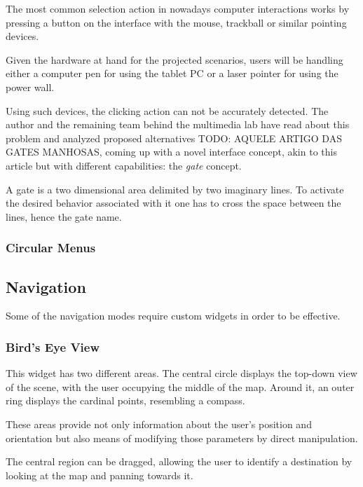 The most common selection action in nowadays computer interactions works by
pressing a button on the interface with the mouse, trackball or similar pointing devices.

Given the hardware at hand for the projected scenarios,
users will be handling either a computer pen for using the tablet PC or a laser pointer for using the power wall.

Using such devices, the clicking action can not be accurately detected.
The author and the remaining team behind the multimedia lab have read about this problem and analyzed proposed alternatives {TODO: AQUELE ARTIGO DAS GATES MANHOSAS},
coming up with a novel interface concept, akin to this article but with different capabilities: the \emph{gate} concept.

A gate is a two dimensional area delimited by two imaginary lines. To activate the desired behavior associated
with it one has to cross the space between the lines, hence the gate name.


\subsubsection{Circular Menus}


\subsection{Navigation}

Some of the navigation modes require custom widgets in order to be effective.

\subsubsection{Bird's Eye View}

This widget has two different areas.
The central circle displays the top-down view of the scene, with the user occupying the middle of the map.
Around it, an outer ring displays the cardinal points, resembling a compass.

These areas provide not only information about the user's position and orientation but also means of
modifying those parameters by direct manipulation.


The central region can be dragged, allowing the user to identify a destination by looking at the map and
panning towards it.


